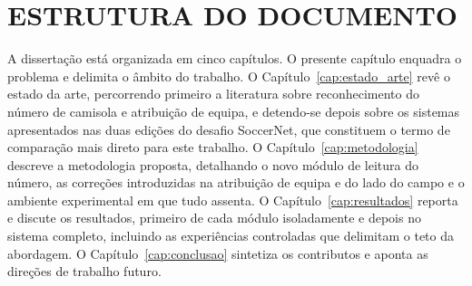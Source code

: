 \section*{ESTRUTURA DO DOCUMENTO}

A dissertação está organizada em cinco capítulos. O presente capítulo enquadra o problema
e delimita o âmbito do trabalho. O Capítulo~\ref{cap:estado_arte} revê o estado da arte,
percorrendo primeiro a literatura sobre reconhecimento do número de camisola e atribuição
de equipa, e detendo-se depois sobre os sistemas apresentados nas duas edições do desafio
SoccerNet, que constituem o termo de comparação mais direto para este trabalho. O
Capítulo~\ref{cap:metodologia} descreve a metodologia proposta, detalhando o novo módulo
de leitura do número, as correções introduzidas na atribuição de equipa e do lado do campo
e o ambiente experimental em que tudo assenta. O Capítulo~\ref{cap:resultados} reporta e
discute os resultados, primeiro de cada módulo isoladamente e depois no sistema completo,
incluindo as experiências controladas que delimitam o teto da abordagem. O
Capítulo~\ref{cap:conclusao} sintetiza os contributos e aponta as direções de trabalho
futuro.
